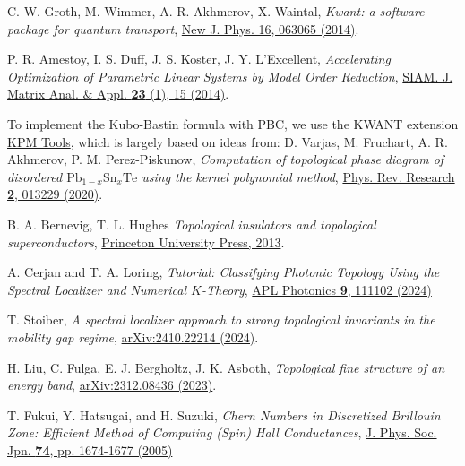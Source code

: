 \documentclass[aps,prb,amsmath,amssymb,twocolumn, superscriptaddress]{revtex4-2}
\begin{document}
\begin{thebibliography}{10}
 C. W. Groth, M. Wimmer, A. R. Akhmerov, X. Waintal, {\em Kwant: a software package for quantum transport}, \href{https://iopscience.iop.org/article/10.1088/1367-2630/16/6/063065}{New J. Phys. 16, 063065 (2014)}.

P. R. Amestoy, I. S. Duff, J. S. Koster, J. Y. L’Excellent, {\em Accelerating Optimization of Parametric Linear Systems by Model Order Reduction}, \href{https://epubs.siam.org/doi/10.1137/120869171}{SIAM. J. Matrix Anal. \& Appl. {\bf 23} (1), 15 (2014)}. 

To implement the Kubo-Bastin formula with PBC, we use the KWANT extension \href{https://kpm-tools.readthedocs.io/en/latest/index.html}{KPM Tools}, which is largely based on ideas from: 
D. Varjas, M. Fruchart, A. R. Akhmerov, P. M. Perez-Piskunow, {\em Computation of topological phase diagram of disordered $\mathrm{Pb}_{1-x} \mathrm{Sn}_x \mathrm{Te}$ using the kernel polynomial method}, \href{https://journals.aps.org/prresearch/abstract/10.1103/PhysRevResearch.2.013229}{Phys. Rev. Research {\bf 2}, 013229 (2020)}. 

B. A. Bernevig, T. L. Hughes {\em Topological insulators and topological superconductors}, \href{https://collaborate.princeton.edu/en/publications/topological-insulators-and-topological-superconductors}{Princeton University Press, 2013}.

A. Cerjan and T. A. Loring, {\em Tutorial: Classifying Photonic Topology Using the Spectral Localizer and Numerical $K$-Theory}, \href{https://pubs.aip.org/aip/app/article/9/11/111102/3322376/Classifying-photonic-topology-using-the-spectral}{APL Photonics {\bfseries 9}, 111102 (2024)}

T. Stoiber, {\em A spectral localizer approach to strong topological invariants in the mobility gap regime}, \href{https://arxiv.org/abs/2410.22214}{ arXiv:2410.22214 (2024)}.

H. Liu, C. Fulga, E. J. Bergholtz, J. K. Asboth, {\em Topological fine structure of an energy band}, \href{https://arxiv.org/abs/2312.08436}{arXiv:2312.08436 (2023)}.

T. Fukui, Y. Hatsugai, and H. Suzuki, {\em Chern Numbers in Discretized Brillouin Zone: Efficient Method of Computing (Spin) Hall Conductances}, \href{https://journals.jps.jp/doi/10.1143/JPSJ.74.1674}{
J. Phys. Soc. Jpn. {\bfseries 74}, pp. 1674-1677 (2005)}

\end{thebibliography}
\end{document}
